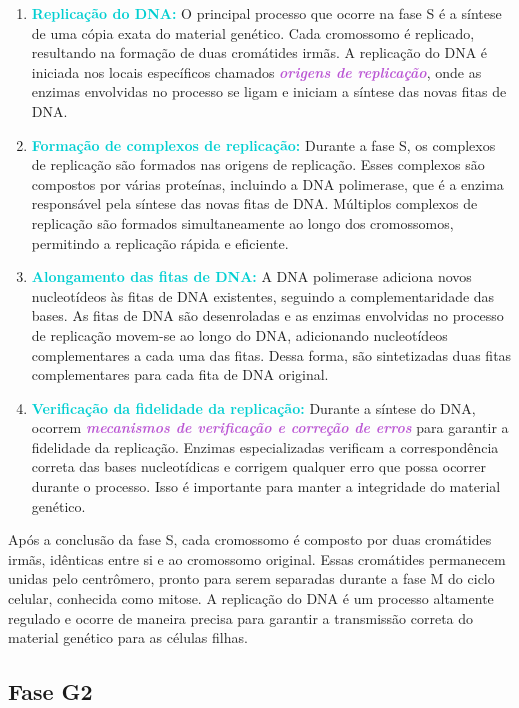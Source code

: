 \documentclass[11pt,a4paper]{article}
\begin{document}
	\begin{enumerate}
		\item \textcolor{DarkTurquoise}{\textbf{Replicação do DNA:}} O principal processo que ocorre na fase S é a síntese de uma cópia exata do material genético. Cada cromossomo é replicado, resultando na formação de duas cromátides irmãs. A replicação do DNA é iniciada nos locais específicos chamados \textcolor{MediumOrchid}{\textbf{\textit{origens de replicação}}}, onde as enzimas envolvidas no processo se ligam e iniciam a síntese das novas fitas de DNA. 
		\item \textcolor{DarkTurquoise}{\textbf{Formação de complexos de replicação:}} Durante a fase S, os complexos de replicação são formados nas origens de replicação. Esses complexos são compostos por várias proteínas, incluindo a DNA polimerase, que é a enzima responsável pela síntese das novas fitas de DNA. Múltiplos complexos de replicação são formados simultaneamente ao longo dos cromossomos, permitindo a replicação rápida e eficiente.
		\item \textcolor{DarkTurquoise}{\textbf{Alongamento das fitas de DNA:}} A DNA polimerase adiciona novos nucleotídeos às fitas de DNA existentes, seguindo a complementaridade das bases. As fitas de DNA são desenroladas e as enzimas envolvidas no processo de replicação movem-se ao longo do DNA, adicionando nucleotídeos complementares a cada uma das fitas. Dessa forma, são sintetizadas duas fitas complementares para cada fita de DNA original.
		\item \textcolor{DarkTurquoise}{\textbf{Verificação da fidelidade da replicação:}}  Durante a síntese do DNA, ocorrem \textcolor{MediumOrchid}{\textbf{\textit{mecanismos de verificação e correção de erros}}} para garantir a fidelidade da replicação. Enzimas especializadas verificam a correspondência correta das bases nucleotídicas e corrigem qualquer erro que possa ocorrer durante o processo. Isso é importante para manter a integridade do material genético.
	\end{enumerate}

	Após a conclusão da fase S, cada cromossomo é composto por duas cromátides irmãs, idênticas entre si e ao cromossomo original. Essas cromátides permanecem unidas pelo centrômero, pronto para serem separadas durante a fase M do ciclo celular, conhecida como mitose. A replicação do DNA é um processo altamente regulado e ocorre de maneira precisa para garantir a transmissão correta do material genético para as células filhas.

\subsection*{Fase G2}
\end{document}
